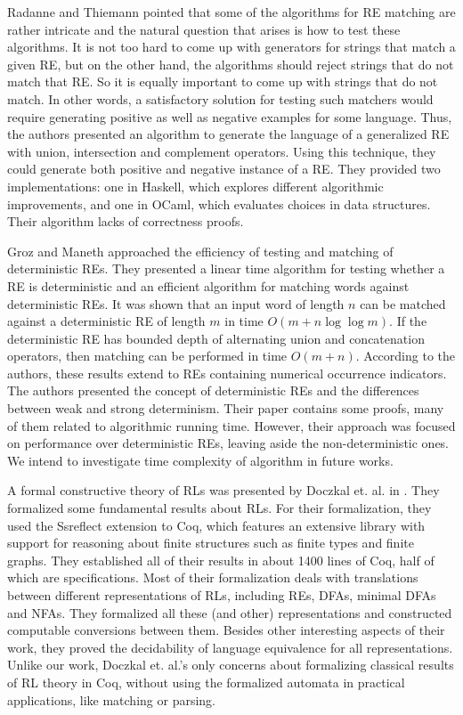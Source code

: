 \documentclass[review]{elsarticle}
\theoremstyle{definition}
\begin{document}
Radanne and Thiemann \cite{radanne:hal-01788827} pointed that some of the
algorithms for RE matching are rather intricate and the natural question 
that arises is how to test these algorithms. It is not too hard to come 
up with generators for strings that match a given RE, but on the other hand, 
the algorithms should reject strings that do not match that RE. So it is 
equally important to come up with strings that do not match. In other words, 
a satisfactory solution for testing such matchers would require generating 
positive as well as negative examples for some language. Thus, the authors 
presented an algorithm to generate the language of a generalized RE with union, 
intersection and complement operators. Using this technique, they could generate 
both positive and negative instance of a RE. They provided two implementations: 
one in Haskell, which explores different algorithmic improvements, and one in 
OCaml, which evaluates choices in data structures. Their algorithm lacks of 
correctness proofs. 

Groz and Maneth \cite{Groz2017} approached the efficiency of testing and
matching of deterministic REs. They presented a linear time algorithm for
testing whether a RE is deterministic and an efficient algorithm for matching
 words against deterministic REs. It was shown that an input word of length 
$n$ can be matched against a deterministic RE of length $m$ in time 
$O (m + n  \log \log m)$. If the deterministic RE has bounded depth 
of alternating union and concatenation operators, then matching can be
 performed in time $O (m + n)$. According to the authors, these results 
extend to REs containing numerical occurrence indicators. The authors 
presented the concept of deterministic REs and the differences between weak 
and strong determinism. Their paper contains some proofs, many of them related 
to algorithmic running time. However, their approach was focused on performance 
over deterministic REs, leaving aside the non-deterministic ones. We intend to 
investigate time complexity of algorithm in future works. 

A formal constructive theory of RLs was presented by Doczkal et. al. in
\cite{Doczkal2013}. They formalized some fundamental results about RLs. 
For their formalization, they used the Ssreflect extension to Coq, which 
features an extensive library with support for reasoning about finite 
structures such as finite types and finite graphs. They established all 
of their results in about 1400 lines of Coq, half of which are specifications. 
Most of their formalization deals with translations between different 
representations of RLs, including REs, DFAs, minimal DFAs and NFAs. 
They formalized all these (and other) representations and constructed 
computable conversions between them. Besides other interesting aspects 
of their work, they proved the decidability of language equivalence 
for all representations. Unlike our work, Doczkal et. al.'s only concerns 
about formalizing classical results of RL theory in Coq, without using the 
formalized automata in practical applications, like matching or parsing.  
\end{document}
